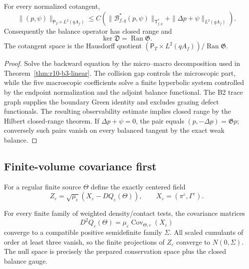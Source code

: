 \begin{theorem}
\label{thm:r10-b3-gauge}
For every normalized cotangent,
\[
 \|(p,\psi)\|_{\mathsf P_T\times L^2(qA_f)}
 \le C\left(
  \|\mathcal B_{f,q}^*(p,\psi)\|_{\mathsf T_{f,q}^*}
  +\|\Delta p+\psi\|_{L^2(qA_f)}
 \right).
\]
Consequently the balance operator has closed range and
\[
 \ker\mathfrak D=\operatorname{Ran}\mathfrak G.
\]
The cotangent space is the Hausdorff quotient
$(\mathsf P_T\times L^2(qA_f))/\operatorname{Ran}\mathfrak G$.
\end{theorem}

\begin{proof}
Solve the backward equation by the micro--macro decomposition used in
Theorem~\ref{thm:r10-b3-linear}.  The collision gap controls the microscopic
part, while the five macroscopic coefficients solve a finite hyperbolic
system controlled by the endpoint normalization and the adjoint balance
functional.  The B2 trace graph supplies the boundary Green identity and
excludes grazing defect functionals.  The resulting observability estimate
implies closed range by the Hilbert closed-range theorem.  If
$\Delta p+\psi=0$, the pair equals $(p,-\Delta p)=\mathfrak Gp$; conversely
such pairs vanish on every balanced tangent by the exact weak balance.
\end{proof}

\subsection{Finite-volume covariance first}

For a regular finite source $\Theta$ define the exactly centered field
\[
 Z_\varepsilon
 =\sqrt{\mu_\varepsilon}
 \left(X_\varepsilon-DQ_\varepsilon(\Theta)\right),
 \qquad X_\varepsilon=(\pi^\varepsilon,\Gamma^\varepsilon).
\]

\begin{theorem}
\label{thm:r10-b3-finite}
For every finite family of weighted density/contact tests, the covariance
matrices
\[
 D^2Q_\varepsilon(\Theta)
 =\mu_\varepsilon\operatorname{Cov}_{\Theta,\varepsilon}(X_\varepsilon)
\]
converge to a compatible positive semidefinite family $\Sigma$.  All scaled
cumulants of order at least three vanish, so the finite projections of
$Z_\varepsilon$ converge to $N(0,\Sigma)$.  The null space is precisely the
prepared conservation space plus the closed balance gauge.
\end{theorem}

